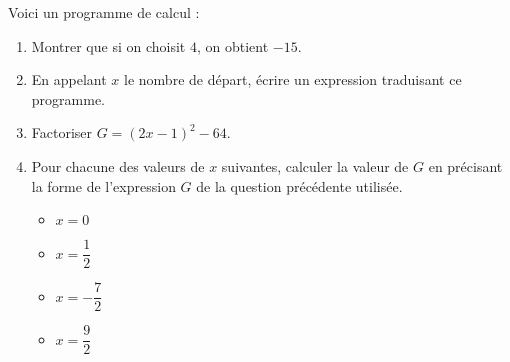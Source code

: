 \begin{exercice*}
    Voici un programme de calcul :
    \begin{enumerate}
        \item Montrer que si on choisit $4$, on obtient $-15$.
        \item En appelant $x$ le nombre de départ, écrire un expression traduisant ce programme.
        \item Factoriser $G = (2x-1)^2-64$.
        \item Pour chacune des valeurs de $x$ suivantes, calculer la valeur de $G$ en précisant la forme de l'expression $G$ de la question précédente utilisée.
        \begin{multicols}{2}
            \begin{itemize}
                \item $x=0$
                \item $x=\dfrac12$
                \item $x=-\dfrac72$
                \item $x=\dfrac92$
            \end{itemize}
        \end{multicols}
    \end{enumerate}
\end{exercice*}
